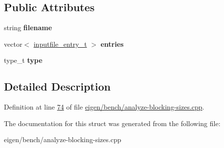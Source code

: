 \subsection*{Public Attributes}
\begin{DoxyCompactItemize}
\item 
\mbox{\label{structinputfile__t_a2590cc042ece35d3f8347e3d78669f91}} 
string {\bfseries filename}
\item 
\mbox{\label{structinputfile__t_afef6646d320adf4e183fce2b05e48c08}} 
vector$<$ \hyperlink{structinputfile__entry__t}{inputfile\+\_\+entry\+\_\+t} $>$ {\bfseries entries}
\item 
\mbox{\label{structinputfile__t_a452bd89c2a17cb20e8107d2e4f4614e0}} 
type\+\_\+t {\bfseries type}
\end{DoxyCompactItemize}


\subsection{Detailed Description}


Definition at line \hyperlink{eigen_2bench_2analyze-blocking-sizes_8cpp_source_l00074}{74} of file \hyperlink{eigen_2bench_2analyze-blocking-sizes_8cpp_source}{eigen/bench/analyze-\/blocking-\/sizes.\+cpp}.



The documentation for this struct was generated from the following file\+:\begin{DoxyCompactItemize}
\item 
eigen/bench/analyze-\/blocking-\/sizes.\+cpp\end{DoxyCompactItemize}
